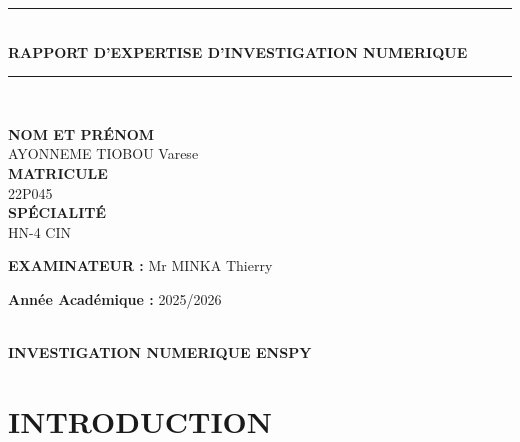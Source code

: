 \documentclass[12pt, a4em]{article}
\begin{document}
\begin{titlepage}
		\vspace{2cm}
		\begin{center}
			\rule{14cm}{1pt} \\[0.1cm]
			{\Large \bfseries RAPPORT D'EXPERTISE D'INVESTIGATION NUMERIQUE} \\[0.0001cm] 
			\rule{14cm}{1pt} \\[2cm]
		\end{center}
		
		\begin{center}
			\textbf{NOM ET PRÉNOM}\\
			AYONNEME TIOBOU Varese\\[0.5cm]
			\textbf{MATRICULE}\\
			22P045\\[0.5cm]
			\textbf{SPÉCIALITÉ}\\
			HN-4 CIN
		\end{center}
		
		\vspace{2cm}
		
		\begin{flushleft}
			\textbf{EXAMINATEUR :} Mr MINKA Thierry
		\end{flushleft}
		
		\begin{flushright}
			\textbf{Année Académique :} 2025/2026
		\end{flushright}
		
		\vfill
		
		\begin{center}
			\\[0.05cm]
			\textbf{\color{black}INVESTIGATION NUMERIQUE \hspace{1cm}  \hspace{5cm} ENSPY}
		\end{center}
	\end{titlepage}
	
	\tableofcontents
	
	\pagebreak
	
	\section*{INTRODUCTION}
	
\end{document}
